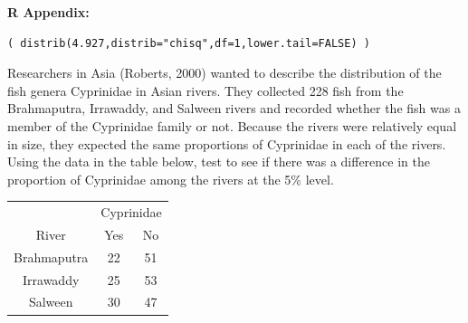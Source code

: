 \documentclass[10pt,openany]{book}\usepackage[]{graphicx}\usepackage[]{color}
\makeatletter
\newenvironment{kframe}{%
 \def\at@end@of@kframe{}%
 \ifinner\ifhmode%
  \def\at@end@of@kframe{\end{minipage}}%
  \begin{minipage}{\columnwidth}%
 \fi\fi%
 \def\FrameCommand##1{\hskip\@totalleftmargin \hskip-\fboxsep
 \colorbox{shadecolor}{##1}\hskip-\fboxsep
     \hskip-\linewidth \hskip-\@totalleftmargin \hskip\columnwidth}%
 \MakeFramed {\advance\hsize-\width
   \@totalleftmargin\z@ \linewidth\hsize
   \@setminipage}}%
 {\par\unskip\endMakeFramed%
 \at@end@of@kframe}
\newenvironment{knitrout}{}{} %
\makeatother
\begin{document}
\vspace{-6pt}
\begin{minipage}{\textwidth}
\textbf{R Appendix:}
\vspace{-6pt}
\begin{knitrout}
\color{fgcolor}\begin{kframe}
\begin{verbatim}
( distrib(4.927,distrib="chisq",df=1,lower.tail=FALSE) )
\end{verbatim}
\end{kframe}
\end{knitrout}
\end{minipage}


\begin{exsection}
  \item \label{revex:ChiCyprin} Researchers in Asia (Roberts, 2000) wanted to describe the distribution of the fish genera Cyprinidae in Asian rivers.  They collected 228 fish from the Brahmaputra, Irrawaddy, and Salween rivers and recorded whether the fish was a member of the Cyprinidae family or not.  Because the rivers were relatively equal in size, they expected the same proportions of Cyprinidae in each of the rivers.  Using the data in the table below, test to see if there was a difference in the proportion of Cyprinidae among the rivers at the 5\% level. 
  \begin{center}
    \begin{tabular}{|c|c|c|}
      \multicolumn{1}{c}{} & \multicolumn{2}{c}{Cyprinidae} \\
      \cline{2-3}
      \multicolumn{1}{c|}{River} & Yes & No \\
      \hline
      Brahmaputra & 22 & 51 \\
      \hline
      Irrawaddy & 25 & 53 \\
      \hline
      Salween & 30 & 47 \\
      \hline
    \end{tabular}
  \end{center}


\end{exsection}
\end{document}
